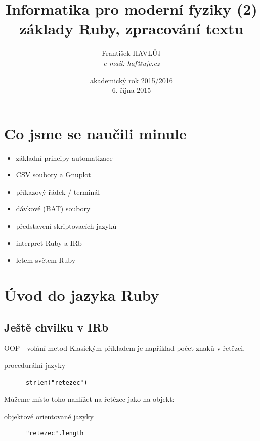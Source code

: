 \documentclass{beamer}
\title[IMF (2)]{Informatika pro moderní fyziky (2)\\základy Ruby, zpracování textu}
\author[Franti\v{s}ek HAVL\r{U}J, ORF ÚJV Řež]{Franti\v{s}ek HAVL\r{U}J\\{\scriptsize \emph{e-mail: haf@ujv.cz}}}
\date{akademický rok 2015/2016\\6. října 2015}
\institute[ORF ÚJV Řež]
{ÚJV Řež\\oddělení Reaktorové fyziky a podpory palivového cyklu}
\begin{document}
\begin{frame}
  \titlepage
\end{frame}

\begin{frame}
  \tableofcontents
\end{frame}

\section{Co jsme se naučili minule}

\begin{frame}{}
  \begin{itemize}
    \item základní principy automatizace
    \item CSV soubory a Gnuplot
    \item příkazový řádek / terminál
    \item dávkové (BAT) soubory
    \item představení skriptovacích jazyků
    \item interpret Ruby a IRb
    \item letem světem Ruby 
  \end{itemize}
\end{frame}


\section{Úvod do jazyka Ruby}

\subsection{Ještě chvilku v IRb}

\begin{frame}[fragile]{OOP - volání metod}
  Klasickým příkladem je například počet znaků v řetězci.
  \begin{block}{procedurální jazyky}
    \begin{verbatim}
      strlen("retezec")
    \end{verbatim}
  \end{block}
  \pause
  Můžeme místo toho nahlížet na řetězec jako na objekt:
  \pause
  \begin{block}{objektově orientované jazyky}
    \begin{verbatim}
      "retezec".length
    \end{verbatim}
  \end{block}
\end{frame}
\end{document}

